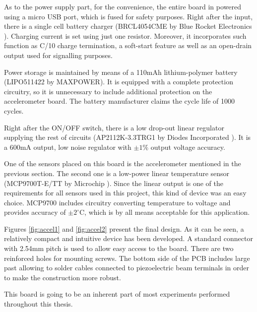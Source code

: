 \documentclass[12pt,a4paper]{article}
\begin{document}
As to the power supply part, for the convenience, the entire board in powered using a micro USB port, which is fused for safety purposes. Right after the input, there is a single cell battery charger (BRCL4054CME by Blue Rocket Electronics \cite{charger_params}). Charging current is set using just one resistor. Moreover, it incorporates such function as C/10 charge termination, a soft-start feature as well as an open-drain output used for signalling purposes.
\par
Power storage is maintained by means of a 110mAh lithium-polymer battery (LIPO511422 by MAXPOWER). It is equipped with a complete protection circuitry, so it is unnecessary to include additional protection on the accelerometer board. The battery manufacturer claims the cycle life of 1000 cycles.
\par

Right after the ON/OFF switch, there is a low drop-out linear regulator supplying the rest of circuits (AP2112K-3.3TRG1 by Diodes Incorporated \cite{ap2112_params}). It is a 600mA output, low noise regulator with $\pm{1}\%$ output voltage accuracy.
\par

One of the sensors placed on this board is the accelerometer mentioned in the previous section. The second one is a low-power linear temperature sensor (MCP9700T-E/TT by Microchip \cite{mcp9700_params}). Since the linear output is one of the requirements for all sensors used in this project, this kind of device was an easy choice. MCP9700 includes circuitry converting temperature to voltage and provides accuracy of $\pm{2}^\circ $C, which is by all means acceptable for this application.
\par

Figures \ref{fig:accel1} and \ref{fig:accel2} present the final design. As it can be seen, a relatively compact and intuitive device has been developed. A standard connector with 2.54mm pitch is used to allow easy access to the board. There are two reinforced holes for mounting screws. The bottom side of the PCB includes large past allowing to solder cables connected to piezoelectric beam terminals in order to make the construction more robust.
\par

This board is going to be an inherent part of most experiments performed throughout this thesis.
\end{document}
